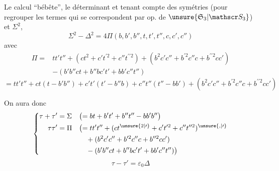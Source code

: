 Le calcul ``bébête'',  le déterminant et tenant compte des symétries (pour regrouper les termes qui se correspondent par  op. de $\unsure{\mathfrak S_3|\mathscr S_3}$) et $\Sigma^2$,
\[
 \Sigma^2-\Delta^2=4\Pi(b,b',b'',t,t',t'',c,c',c'')
\]
avec
\[
\boxed{\begin{aligned}
 \Pi={}&tt't''+(ct^2+c't^{\prime 2}+c''t^{\prime\prime 2})+(b^2c'c''+b^{\prime 2}c''c+b^{\prime\prime 2}cc')\\
 &-(b'b''ct+b''bc't'+bb'c''t'')
\end{aligned}}
\]
\[
 =tt't''+ct(t-b'b'')+c't'(t'-b''b)+c''t''(t''-bb')+(b^2c'c''+b^{\prime 2}c''c+b^{\prime\prime 2}cc')
\]

On aura donc
\[
 \left\{\begin{aligned}
 \tau+\tau'&=\Sigma&&\bigl(=bt+b't'+b''t''-bb'b''\bigr)\\
 \tau\tau'&=\Pi&&\bigl(=tt't''+(ct^{\unsure{2|\prime}}+c't^{\prime 2}+c''t^{\prime\prime 2})^{\unsure{,|\prime}}\\
 &&&\quad+(b^2c'c''+b^{\prime 2}c''c+b^{\prime\prime 2}cc')\\
 &&&\quad-(b'b''ct+b''bc't'+bb'c''t'')\bigr)
 \end{aligned}\right.
\]
\[
 \tau-\tau'=\varepsilon_0\Delta
\]
